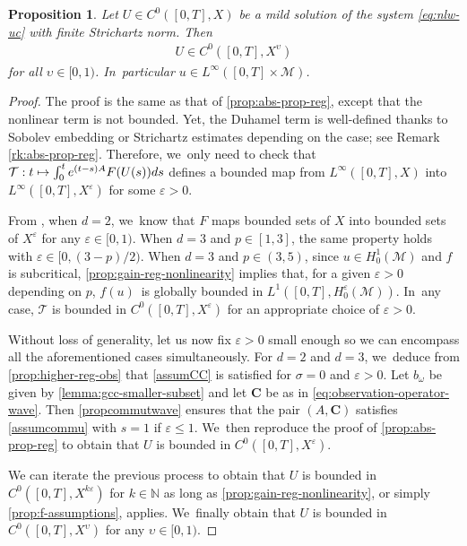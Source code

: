 \documentclass[10pt]{amsart}
\newcommand\mto{\mathchoice{\longmapsto}{\mapsto}{\mapsto}{\mapsto}}
\newtheorem{proposition}[theorem]{Proposition}
\theoremstyle{definition}
\let\mc\mathcal
\let\veps\varepsilon
\newcommand{\M}{\mc{M}}
\newcommand{\T}{\mc{T}}
\newcommand{\N}{\mathbb{N}}
\newcommand{\bC}{\boldsymbol{C}}
\begin{document}
\begin{proposition}\label{prop:propagation-regularity}
Let $U\in C^0([0, T], X)$ be a mild solution of the system \eqref{eq:nlw-uc} with finite Strichartz norm. Then
\begin{align*}
U\in C^0([0, T], X^{\upsilon})
\end{align*}
for all $\upsilon\in [0, 1)$. In~particular $u\in L^\infty([0, T]\times \M)$.
\end{proposition}

\begin{proof}
The proof is the same as that of \cref{prop:abs-prop-reg}, except that the nonlinear term is not bounded. Yet, the Duhamel term is well-defined thanks to Sobolev embedding or Strichartz estimates depending on the case; see Remark \ref{rk:abs-prop-reg}. Therefore, we~only need to check that $\T: t\mto \int_0^t e^{(t-s)A}F(U(s))ds$ defines a bounded map from $L^\infty([0, T], X)$ into $L^\infty([0, T], X^\veps)$ for some $\veps>0$.

From \cite[Prop.\,3.2]{2020:joly-laurent:decay-nlw-no-gcc}, when $d=2$, we~know that $F$ maps bounded sets of $X$ into bounded sets of $X^\veps$ for any $\veps\in [0, 1)$. When $d=3$ and $p\in [1, 3]$, the same property holds with $\veps\in [0, (3-p)/2)$. When $d=3$ and $p\in (3, 5)$, since $u\in H_0^1(\M)$ and $f$ is subcritical, \cref{prop:gain-reg-nonlinearity} implies that, for a given $\veps>0$ depending on $p$, $f(u)$~is globally bounded in $L^1([0, T], H_0^{\veps}(\M))$. In~any case, $\T$ is bounded in $C^0([0, T], X^\veps)$ for an appropriate choice of $\veps>0$.

Without loss of generality, let us now fix $\veps>0$ small enough so we can encompass all the aforementioned cases simultaneously. For $d=2$ and $d=3$, we~deduce from \cref{prop:higher-reg-obs} that \cref{assumCC} is satisfied for $\sigma=0$ and $\veps>0$. Let $b_\omega$ be given by \cref{lemma:gcc-smaller-subset} and let $\bC$ be as in \eqref{eq:observation-operator-wave}. Then \cref{propcommutwave} ensures that the pair $(A, \bC)$ satisfies \cref{assumcommu} with $s=1$ if $\veps\leq 1$. We~then reproduce the proof of \cref{prop:abs-prop-reg} to obtain that $U$ is bounded in $C^0([0, T], X^\veps)$.

We can iterate the previous process to obtain that $U$ is bounded in $C^0([0, T], X^{k\veps})$ for $k\in \N$ as long as \cref{prop:gain-reg-nonlinearity}, or simply \cref{prop:f-assumptions}, applies. We~finally obtain that $U$ is bounded in $C^0([0, T], X^\upsilon)$ for any $\upsilon\in [0, 1)$.
\end{proof}
\end{document}
